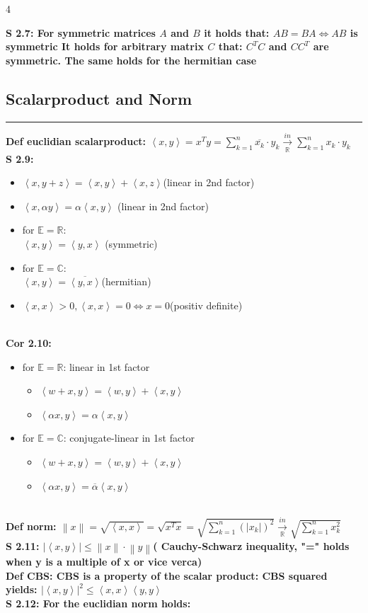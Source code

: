 \documentclass[7pt,landscape, margin = 0.1mm]{article}
\newcommand*{\mysubsection}[1]{\vspace{-2mm}\color{chaptercolor}\subsection{ #1 }
\vspace{-1mm}\hrule\vspace{1.5mm}\color{black}
\vspace{2mm}}
\newcommand{\DEF}[2]{\color{chaptercolor}\bf{Def #1}:\color{black}    \hspace{0.2cm} #2 \\}
\newcommand{\COR}[2]{\color{chaptercolor}\bf{Cor #1}:\color{black}    \hspace{0.2cm} #2 \\}
\newcommand{\SA}[2]{\color{chaptercolor}\bf{S #1}:\color{black}    \hspace{0.2cm} #2 \\}
\begin{document}
\begin{multicols}{4}
\begin{flushleft}
{\begin{itemize}
\end{itemize}}
\SA{2.7}{For symmetric matrices $A$ and $B$ it holds that: 
$AB=BA \Leftrightarrow AB $ is symmetric
It holds for arbitrary matrix $C$ that:
$C^T C$ and $ CC^T$ are symmetric. The same holds for the hermitian case}
\mysubsection{\centering Scalarproduct and Norm}
\DEF{euclidian scalarproduct}{ $\left< x,y\right> = x^T y = \sum_{k=1}^{n} \overline{x_k} \cdot y_k \xrightarrow[ \mathbb{R}]{in}\sum_{k=1}^{n} x_k \cdot y_k$}
\SA{2.9}{\begin{itemize}

\item[S1] $ \left< x,y+z\right>=\left< x,y\right>+\left< x,z\right> $(linear in 2nd factor)
\item[S1] $ \left< x,\alpha y\right> = \alpha\left< x,y\right>$ (linear in 2nd factor)
\item[S2] for $ \mathbb{E} = \mathbb{R}$:\\$\left< x,y\right>=\left< y,x\right>$ (symmetric)
\item[S2'] for $ \mathbb{E} = \mathbb{C}$:\\$ \left< x,y\right>=\overline{\left< y,x\right>}$(hermitian)
\item[S3] $ \left< x,x\right> > 0, \left< x,x\right>=0\Leftrightarrow x=0$(positiv definite)
 
\end{itemize}}
\COR{2.10}{\begin{itemize}
\item[S4] for $\mathbb{E} = \mathbb{R} $: linear in 1st factor
\begin{itemize}
\item[] $ \left< w+x,y\right>=\left< w,y\right>+\left< x,y\right> $
\item[]  $ \left<\alpha x , y\right> = \alpha\left< x,y\right> $
\end{itemize}
\item[S4'] for $\mathbb{E} = \mathbb{C} $: conjugate-linear in 1st factor 
\begin{itemize}
\item[] $ \left< w+x,y\right>=\left< w,y\right>+\left< x,y\right> $
\item[] $ \left< \alpha x , y\right> = \overline{\alpha}\left< x,y\right> $
\end{itemize}
\end{itemize}}



\DEF{norm}{$ \left\|x \right\| = \sqrt{\left< x,x\right>}=\sqrt{x^T x} = \sqrt{\sum_{k=1}^{n} (|x_k|)^2} \xrightarrow[\mathbb{R}]{in} \sqrt{\sum_{k=1}^{n} x_k^2}$}
\SA{2.11}{$|\left< x,y\right>| \leq \left\|x \right\| \cdot  \left\|y \right\|$( Cauchy-Schwarz inequality, "=" holds when y is a multiple of x or vice verca)}
\DEF{CBS}{CBS is a property of the scalar product: CBS squared yields: $|\left< x,y \right>|^2 \leq \left< x,x \right>\left< y,y\right> $}
\SA{2.12}{For the euclidian norm holds: \begin{itemize}


\end{itemize}}
\end{flushleft}
\end{multicols}
\end{document}
